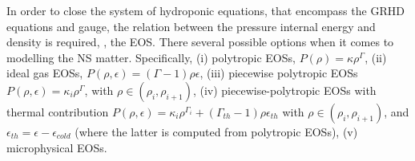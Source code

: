 
In order to close the system of hydroponic equations, that encompass the \ac{GRHD} equations and gauge, the relation between the pressure 
internal energy and density is required, \ie, the \ac{EOS}. 
There several possible options when it comes to modelling the \ac{NS} matter. 
Specifically, 
(i) polytropic \acp{EOS}, $P(\rho)=\kappa\rho^{\Gamma}$, 
(ii) ideal gas \acp{EOS}, $P(\rho,\epsilon)=(\Gamma-1)\rho\epsilon$, 
(iii) piecewise polytropic \acp{EOS} $P(\rho,\epsilon) = \kappa_i\rho^{\Gamma}$, with 
$\rho\in(\rho_i,\rho_{i+1})$, 
(iv) piecewise-polytropic \acp{EOS} with thermal contribution $P(\rho,\epsilon)=\kappa_i\rho^{\Gamma_i} + (\Gamma_{th}-1)\rho\epsilon_{th}$ with $\rho\in(\rho_i,\rho_{i+1})$, and $\epsilon_{th}=\epsilon-\epsilon_{cold}$ (where the latter 
is computed from polytropic \acp{EOS}), 
(v) microphysical \acp{EOS}.



